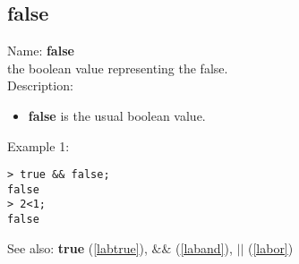 \subsection{false}
\label{labfalse}
\noindent Name: \textbf{false}\\
the boolean value representing the false.\\

\noindent Description: \begin{itemize}

\item \textbf{false} is the usual boolean value.
\end{itemize}
\noindent Example 1: 
\begin{center}\begin{minipage}{15cm}\begin{Verbatim}[frame=single]
> true && false;
false
> 2<1;
false
\end{Verbatim}
\end{minipage}\end{center}
See also: \textbf{true} (\ref{labtrue}), \textbf{$\&\&$} (\ref{laband}), \textbf{$||$} (\ref{labor})
